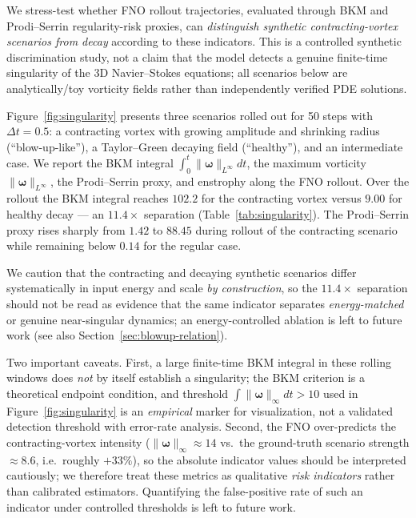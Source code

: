 \documentclass[review]{elsarticle}
\begin{document}
We stress-test whether FNO rollout trajectories, evaluated through BKM and Prodi--Serrin
regularity-risk proxies, can \emph{distinguish synthetic contracting-vortex scenarios from decay}
according to these indicators. This is a controlled synthetic discrimination study, not a claim
that the model detects a genuine finite-time singularity of the 3D Navier--Stokes equations; all
scenarios below are analytically/toy vorticity fields rather than independently verified PDE
solutions.

Figure~\ref{fig:singularity} presents three scenarios rolled out for 50 steps with $\Delta t=0.5$:
a contracting vortex with growing amplitude and shrinking radius (``blow-up-like''), a
Taylor--Green decaying field (``healthy''), and an intermediate case. We report the BKM integral
$\int_0^t\|\bm{\omega}\|_{L^\infty}dt$, the maximum vorticity $\|\bm{\omega}\|_{L^\infty}$, the
Prodi--Serrin proxy, and enstrophy along the FNO rollout. Over the rollout the BKM integral
reaches $102.2$ for the contracting vortex versus $9.00$ for healthy decay --- an $11.4\times$
separation (Table~\ref{tab:singularity}). The Prodi--Serrin proxy rises sharply from $1.42$ to
$88.45$ during rollout of the contracting scenario while remaining below $0.14$ for the regular
case.

We caution that the contracting and decaying synthetic scenarios differ systematically in
input energy and scale \emph{by construction}, so the $11.4\times$ separation should not be
read as evidence that the same indicator separates \emph{energy-matched} or genuine
near-singular dynamics; an energy-controlled ablation is left to future work (see also
Section~\ref{sec:blowup-relation}).

Two important caveats. First, a large finite-time BKM integral in these rolling windows does
\emph{not} by itself establish a singularity; the BKM criterion is a theoretical endpoint
condition, and threshold $\int\|\bm{\omega}\|_\infty dt>10$ used in Figure~\ref{fig:singularity} is
an \emph{empirical} marker for visualization, not a validated detection threshold with error-rate
analysis. Second, the FNO over-predicts the contracting-vortex intensity ($\|\bm{\omega}\|_\infty
\approx 14$ vs.\ the ground-truth scenario strength $\approx 8.6$, i.e.\ roughly $+33\%$), so the
absolute indicator values should be interpreted cautiously; we therefore treat these metrics as
qualitative \emph{risk indicators} rather than calibrated estimators. Quantifying the false-positive
rate of such an indicator under controlled thresholds is left to future work.
\end{document}
